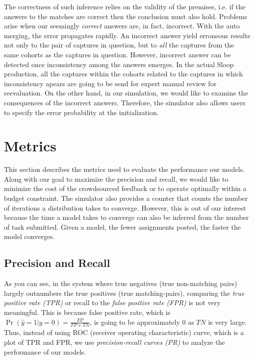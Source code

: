 The correctness of such inference relies on the validity of the premises, i.e.
if the answers to the matches are correct then the conclusion must also hold.
Problems arise when our seemingly \emph{correct} answers are, in fact,
incorrect. With the auto merging, the error propagates rapidly. An incorrect
answer yield erroneous results not only to the pair of captures in question,
but to \emph{all} the captures from the same cohorts as the captures in
question. However, incorrect answer can be  detected once inconsistency among
the answers emerges. In the actual Sloop production, all the captures within
the cohorts related to the captures in which inconsistency apears are going to
be send for expert manual review for reevaluation. On the other hand, in our
simulation, we would like to examine the consequences of the incorrect answers.
Therefore, the simulator also allows users to specify the error probability at
the initialization.

\section{Metrics} %
\label{sec:metrices}

This section describes the metrics used to evaluate the performance our
models. Along with our goal to maximize the precision and recall, we would like
to minimize the cost of the crowdsourced feedback or to operate optimally within a
budget constraint. The simulator also provides a counter that counts the number
of iterations a distribution takes to converge. However, this is out of our
interest because the time a model takes to converge can also be inferred from
the number of task submitted. Given a model, the fewer assignments posted, the
faster the model converges. 

\subsection{Precision and Recall} %
\label{sub:precision_and_recall}

As you can see, in the system where true negatives (true non-matching pairs)
largely outnumbers the true positives (true matching-pairs), comparing the
\emph{true positive rate (TPR)} or recall to the \emph{false positive rate
(FPR)} is not very meaningful. This is because false positive rate, which is
$\Pr{(\hat{y}=1|y=0)} = \frac{FP}{FP+TN}$, is going to be approximately 0 as
$TN$ is very large. Thus, instead of using ROC (receiver operating
characteristic) curve, which is a plot of TPR and FPR, we use
\emph{precision-recall curves (PR)} to analyze the performance of our models.

